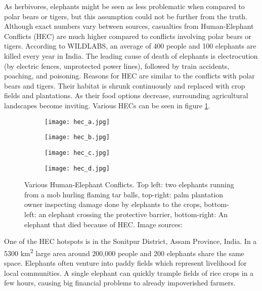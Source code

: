 As herbivores, elephants might be seen as less problematic when compared to polar bears or tigers, but this assumption could not be further from the truth.
Although exact numbers vary between sources, casualties from Human-Elephant Conflicts (HEC) are much higher compared to conflicts involving polar bears or tigers.
According to WILDLABS, an average of 400 people and 100 elephants are killed every year in India\cite{wildlabs-elephants}. 
The leading cause of death of elephants is electrocution (by electric fences, unprotected power lines), followed by train accidents, poaching, and poisoning\cite{cause-of-death}.
Reasons for HEC are similar to the conflicts with polar bears and tigers.
Their habitat is shrunk continuously and replaced with crop fields and plantations.
As their food options decrease, surrounding agricultural landscapes become inviting.  
Various HECs can be seen in figure \ref{various_hec}.
\newline
\begin{figure}[ht]
    \begin{subfigure}{0.5\textwidth}
        \centering
        \texttt{[image: hec\_a.jpg]} 
    \end{subfigure}
    \begin{subfigure}{0.5\textwidth}
        \centering
        \texttt{[image: hec\_b.jpg]} 
    \end{subfigure}
    \begin{subfigure}{0.5\textwidth}
        \centering
        \texttt{[image: hec\_c.jpg]} 
    \end{subfigure}
    \begin{subfigure}{0.5\textwidth}
        \centering
        \texttt{[image: hec\_d.jpg]} 
    \end{subfigure}
\caption[Various Human-Elephant Conflicts.] {Various Human-Elephant Conflicts. Top left: two elephants running from a mob hurling flaming tar balls, top-right: palm plantation owner inspecting damage done by elephants to the crops, bottom-left: an elephant crossing the protective barrier, bottom-right: An elephant that died because of HEC. Image sources:\cite{wildlabs-elephants}\cite{econe_image}\cite{save_our_species_image}\cite{the_week_image}}
    \label{various_hec}
\end{figure}

One of the HEC hotspots is in the Sonitpur District, Assam Province, India. 
In a 5300 km\textsuperscript{2} large area around 200,000 people and 200 elephants share the same space\cite{wildlabs-elephants}.
Elephants often venture into paddy fields which represent livelihood for local communities.
A single elephant can quickly trample fields of rice crops in a few hours, causing big financial problems to already impoverished farmers\cite{wildlabs-elephants}.

